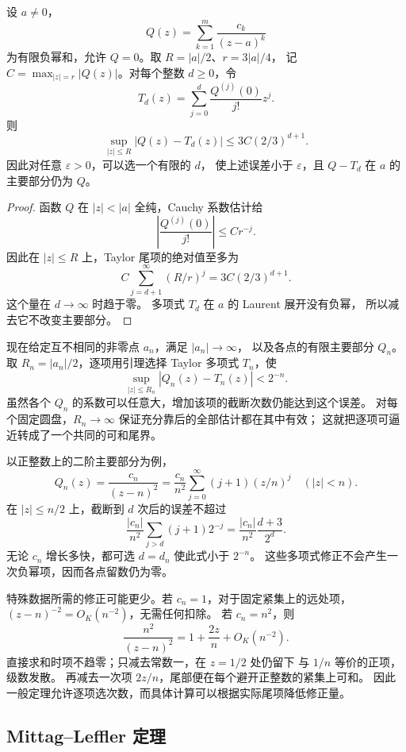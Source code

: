 \begin{lemma}\label{b3:lem:20-taylor-correction}
设 \(a\ne0\)，
\[
 Q(z)=\sum_{k=1}^m\frac{c_k}{(z-a)^k}
\]
为有限负幂和，允许 \(Q=0\)。取 \(R=|a|/2\)、\(r=3|a|/4\)，
记 \(C=\max_{|z|=r}|Q(z)|\)。对每个整数 \(d\ge0\)，令
\[
 T_d(z)=\sum_{j=0}^d\frac{Q^{(j)}(0)}{j!}z^j.
\]
则
\[
 \sup_{|z|\le R}|Q(z)-T_d(z)|
 \le3C(2/3)^{d+1}.
\]
因此对任意 \(\varepsilon>0\)，可以选一个有限的 \(d\)，
使上述误差小于 \(\varepsilon\)，且 \(Q-T_d\) 在 \(a\) 的主要部分仍为 \(Q\)。
\end{lemma}
\begin{proof}
函数 \(Q\) 在 \(|z|<|a|\) 全纯，Cauchy 系数估计给
\[
 \left|\frac{Q^{(j)}(0)}{j!}\right|\le C r^{-j}.
\]
因此在 \(|z|\le R\) 上，Taylor 尾项的绝对值至多为
\[
 C\sum_{j=d+1}^\infty(R/r)^j
 =3C(2/3)^{d+1}.
\]
这个量在 \(d\to\infty\) 时趋于零。
多项式 \(T_d\) 在 \(a\) 的 Laurent 展开没有负幂，
所以减去它不改变主要部分。
\end{proof}

现在给定互不相同的非零点 \(a_n\)，满足 \(|a_n|\to\infty\)，
以及各点的有限主要部分 \(Q_n\)。
取 \(R_n=|a_n|/2\)，逐项用引理选择 Taylor 多项式 \(T_n\)，使
\begin{equation}\label{b3:eq:20-ml-tail-bound}
 \sup_{|z|\le R_n}|Q_n(z)-T_n(z)|<2^{-n}.
\end{equation}
虽然各个 \(Q_n\) 的系数可以任意大，增加该项的截断次数仍能达到这个误差。
对每个固定圆盘，\(R_n\to\infty\) 保证充分靠后的全部估计都在其中有效；
这就把逐项可逼近转成了一个共同的可和尾界。

\ProseParagraphBreak
以正整数上的二阶主要部分为例，
\[
 Q_n(z)=\frac{c_n}{(z-n)^2}
       =\frac{c_n}{n^2}\sum_{j=0}^\infty(j+1)(z/n)^j
       \quad(|z|<n).
\]
在 \(|z|\le n/2\) 上，截断到 \(d\) 次后的误差不超过
\[
 \frac{|c_n|}{n^2}\sum_{j>d}(j+1)2^{-j}
 =\frac{|c_n|}{n^2}\frac{d+3}{2^d}.
\]
无论 \(c_n\) 增长多快，都可选 \(d=d_n\) 使此式小于 \(2^{-n}\)。
这些多项式修正不会产生一次负幂项，因而各点留数仍为零。

\ProseParagraphBreak
特殊数据所需的修正可能更少。若 \(c_n=1\)，对于固定紧集上的远处项，
\((z-n)^{-2}=O_K(n^{-2})\)，无需任何扣除。
若 \(c_n=n^2\)，则
\[
 \frac{n^2}{(z-n)^2}=1+\frac{2z}{n}+O_K(n^{-2}).
\]
直接求和时项不趋零；只减去常数一，在 \(z=1/2\) 处仍留下
与 \(1/n\) 等价的正项，级数发散。
再减去一次项 \(2z/n\)，尾部便在每个避开正整数的紧集上可和。
因此一般定理允许逐项选次数，而具体计算可以根据实际尾项降低修正量。

\subsection{Mittag–Leffler 定理}
\label{b3:subsec:200403}

